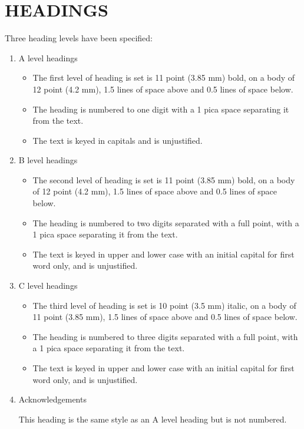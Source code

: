 \documentclass{ecai2014}
\begin{document}
\section{HEADINGS}\label{heads}
Three heading levels have been specified:

\begin{enumerate}
\item{A level headings}

\begin{itemize}
\item The first level of heading is set is 11 point (3.85 mm) bold, on
  a body of 12 point (4.2 mm), 1.5 lines of space above and 0.5 lines
  of space below.

\item The heading is numbered to one digit with a 1 pica space
  separating it from the text.

\item The text is keyed in capitals and is unjustified.
\end{itemize}

\item{B level headings}
\begin{itemize}
\item The second level of heading is set is 11 point (3.85 mm) bold,
  on a body of 12 point (4.2 mm), 1.5 lines of space above and 0.5
  lines of space below.

\item The heading is numbered to two digits separated with a full
  point, with a 1 pica space separating it from the text.

\item The text is keyed in upper and lower case with an initial
  capital for first word only, and is unjustified.
\end{itemize}

\item{C level headings}
\begin{itemize}
\item The third level of heading is set is 10 point (3.5 mm) italic,
  on a body of 11 point (3.85 mm), 1.5 lines of space above and 0.5
  lines of space below.

\item The heading is numbered to three digits separated with a full
  point, with a 1 pica space separating it from the text.

\item The text is keyed in upper and lower case with an initial
  capital for first word only, and is unjustified.
\end{itemize}

\item{Acknowledgements}

  This heading is the same style as an A level heading but is not
  numbered.
\end{enumerate}
\end{document}
